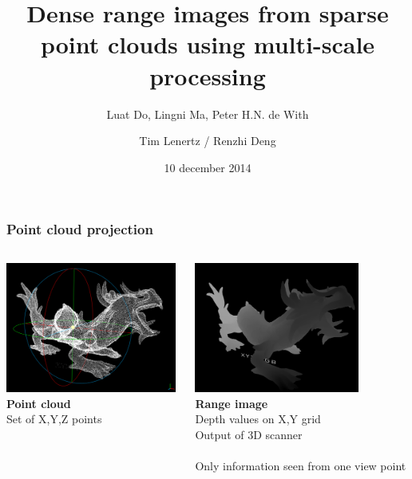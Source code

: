 \documentclass{beamer}
\title{\textbf{Dense range images from sparse point clouds using multi-scale processing}}
\subtitle{Luat Do, Lingni Ma, Peter H.N. de With \quad 2012}
\author{Tim Lenertz / Renzhi Deng}
\date{10 december 2014}
\institute{Université Libre de Bruxelles}
\begin{document}
\begin{frame}
\frametitle{Point cloud projection}
	\begin{columns}
	\begin{column}[T]{.5\textwidth}
		\includegraphics[height=4.3cm]{pointcloud.png}
		\\ \textbf{Point cloud} \\
		Set of X,Y,Z points \\
	\end{column}
	\begin{column}[T]{.5\textwidth}
		\includegraphics[height=4.3cm]{depthmap.png}
		\\ \textbf{Range image} \\
		Depth values on X,Y grid \\
		Output of 3D scanner \\ \\
		Only information seen from one view point \\
		 \\
	\end{column}
	\end{columns}
\end{frame}
\end{document}
